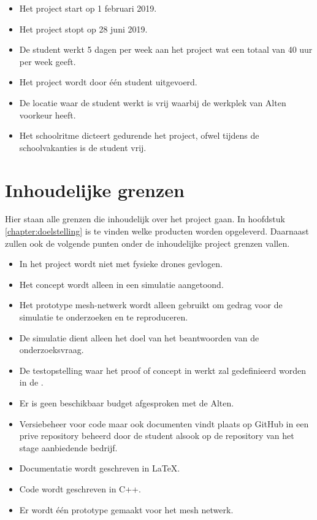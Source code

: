 \documentclass[a4paper, 11pt, oneside]{report}
\begin{document}
\begin{itemize}
	\item Het project start op 1 februari 2019.
	\item Het project stopt op 28 juni 2019.
	\item De student werkt 5 dagen per week aan het project wat een totaal van 40 uur per week geeft.
	\item Het project wordt door één student uitgevoerd.
	\item De locatie waar de student werkt is vrij waarbij de werkplek van Alten voorkeur heeft.
	\item Het schoolritme dicteert gedurende het project, ofwel tijdens de schoolvakanties is de student vrij.
\end{itemize}

\section{Inhoudelijke grenzen}
Hier staan alle grenzen die inhoudelijk over het project gaan. In hoofdstuk \ref{chapter:doelstelling} is te vinden welke producten worden opgeleverd. Daarnaast zullen ook de volgende punten onder de inhoudelijke project grenzen vallen.

\begin{itemize}
	\item In het project wordt niet met fysieke drones gevlogen.
	\item Het concept wordt alleen in een simulatie aangetoond.
	\item Het prototype mesh-netwerk wordt alleen gebruikt om gedrag voor de simulatie te onderzoeken en te reproduceren.
	\item De simulatie dient alleen het doel van het beantwoorden van de onderzoeksvraag.
	\item De testopstelling waar het proof of concept in werkt zal gedefinieerd worden in de .
	\item Er is geen beschikbaar budget afgesproken met de Alten.
	\item Versiebeheer voor code maar ook documenten vindt plaats op GitHub in een prive repository beheerd door de student alsook op de repository van het stage aanbiedende bedrijf.
	\item Documentatie wordt geschreven in \LaTeX.
	\item Code wordt geschreven in C++.
	\item Er wordt één prototype gemaakt voor het mesh netwerk.
\end{itemize}
\end{document}
